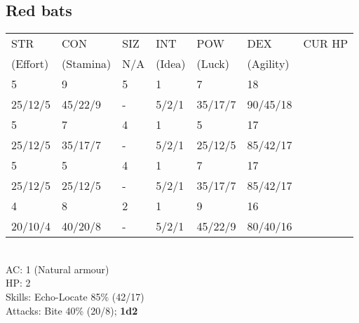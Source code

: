 \documentclass[12pt,a4paper]{article}
\begin{document}
\subsection*{Red bats}
\begin{tabular}{| l | l | l | l | l | l |l|}
\hline
STR & CON & SIZ & INT & POW & DEX & CUR HP\\
(Effort) & (Stamina) & N/A & (Idea) & (Luck) & (Agility) & \\
\hline

5       & 9       & 5 & 1     & 7       & 18       & \\
25/12/5 & 45/22/9 & - & 5/2/1 & 35/17/7 & 90/45/18 & \\ 

\rowcolor{lightgray}
5       & 7       & 4 & 1     & 5       & 17       & \\
\rowcolor{lightgray}
25/12/5 & 35/17/7 & - & 5/2/1 & 25/12/5 & 85/42/17 & \\ 

5       & 5       & 4 & 1     & 7       & 17       & \\
25/12/5 & 25/12/5 & - & 5/2/1 & 35/17/7 & 85/42/17 & \\

\rowcolor{lightgray}
4       & 8       & 2 & 1     & 9       & 16       & \\
\rowcolor{lightgray}
20/10/4 & 40/20/8 & - & 5/2/1 & 45/22/9 & 80/40/16 & \\

\hline
\end{tabular}
\vspace{0.2cm}
\\
AC: 1 (Natural armour)\\
HP: 2\\
Skills: Echo-Locate 85\% (42/17)\\
Attacks: Bite 40\% (20/8); \textbf{1d2}
\end{document}
